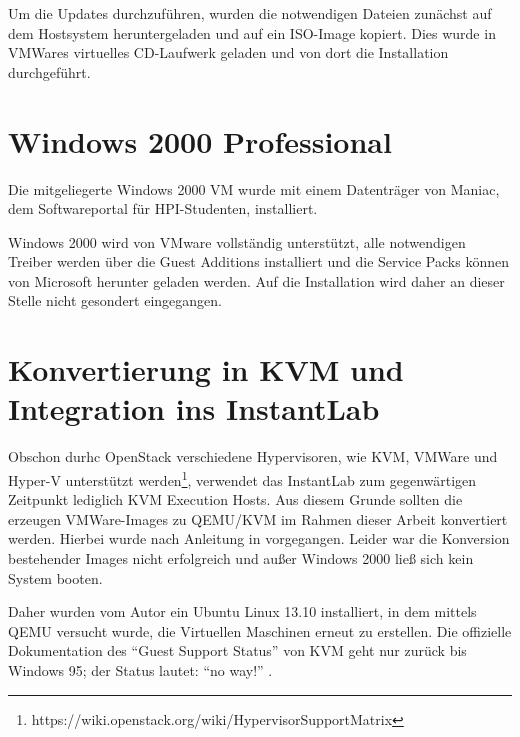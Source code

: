	Um die Updates durchzuführen, wurden die notwendigen Dateien zunächst auf dem Hostsystem heruntergeladen und auf ein ISO-Image kopiert. Dies wurde in VMWares virtuelles CD-Laufwerk geladen und von dort die Installation durchgeführt.

\section{Windows 2000 Professional}

	Die mitgeliegerte Windows 2000 VM wurde mit einem Datenträger von Maniac, dem Softwareportal für HPI-Studenten, installiert.

	Windows 2000 wird von VMware vollständig unterstützt, alle notwendigen Treiber werden über die Guest Additions installiert und die Service Packs können von Microsoft herunter geladen werden.
	Auf die Installation wird daher an dieser Stelle nicht gesondert eingegangen.



\section{Konvertierung in KVM und Integration ins InstantLab}

	Obschon durhc OpenStack verschiedene Hypervisoren, wie KVM, VMWare und Hyper-V unterstützt werden\footnote{https://wiki.openstack.org/wiki/HypervisorSupportMatrix},
	verwendet das InstantLab zum gegenwärtigen Zeitpunkt lediglich KVM Execution Hosts.
	Aus diesem Grunde sollten die erzeugen VMWare-Images zu QEMU/KVM im Rahmen dieser Arbeit konvertiert werden.
	Hierbei wurde nach Anleitung in \cite{VMVDiskMan} vorgegangen. 
	Leider war die Konversion bestehender Images nicht erfolgreich und außer Windows 2000 ließ sich kein System booten.

	Daher wurden vom Autor ein Ubuntu Linux 13.10 installiert, in dem mittels QEMU versucht wurde, die Virtuellen Maschinen erneut zu erstellen.
	Die offizielle Dokumentation des "`Guest Support Status"' von KVM geht nur zurück bis Windows 95;
	der Status lautet: "`no way!"' \cite{KVMStatus}.

